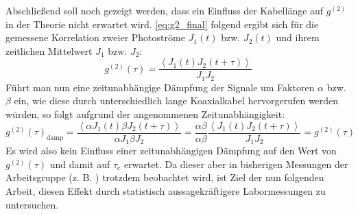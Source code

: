 Abschließend soll noch gezeigt werden, dass ein Einfluss der Kabellänge auf $g^{(2)}$ in der Theorie nicht erwartet wird. 
\autoref{eq:g2_final} folgend ergibt sich für die gemessene Korrelation zweier Photoströme $J_1(t)$ bzw. $J_2(t)$ und ihrem zeitlichen Mittelwert $J_1$ bzw. $J_2$:
\begin{equation}
    g^{(2)}(\tau) = \frac{\left<J_1(t) J_2(t+\tau) \right>}{J_1 J_2}
\end{equation}
Führt man nun eine zeitunabhängige Dämpfung der Signale um Faktoren $\alpha$ bzw. $\beta$ ein, wie diese durch unterschiedlich lange Koaxialkabel hervorgerufen werden würden, so folgt aufgrund der angenommenen Zeitunabhängigkeit:
\begin{equation}
    g^{(2)}(\tau)_{\mathrm{damp}} = \frac{\left<\alpha J_1(t) \beta J_2(t+\tau) \right>}{\alpha J_1 \beta J_2}
    = \frac{\alpha \beta}{\alpha \beta} \frac{\left<J_1(t) J_2(t+\tau) \right>}{J_1 J_2} = g^{(2)}(\tau)
\end{equation}
Es wird also kein Einfluss einer zeitunabhängigen Dämpfung auf den Wert von $g^{(2)}(\tau)$ und damit auf $\tau_{\mathrm{c}}$ erwartet. 
Da dieser aber in bisherigen Messungen der Arbeitsgruppe (z. B. \cite{zmijaFirstIntensityInterferometry2023}) trotzdem beobachtet wird, ist Ziel der nun folgenden Arbeit, diesen Effekt durch statistisch aussagekräftigere Labormessungen zu untersuchen. 